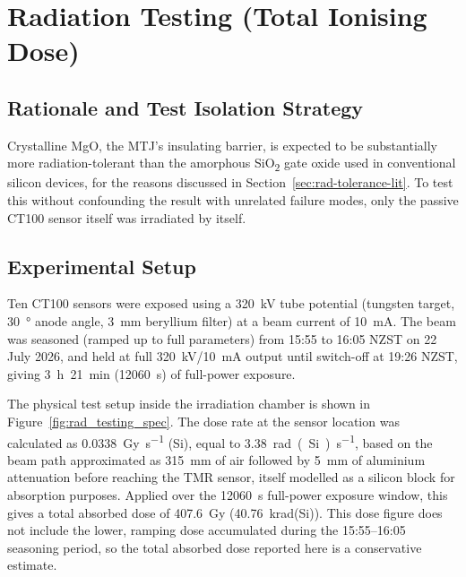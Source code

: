 \documentclass[12pt,a4paper]{article}
\begin{document}
\section{Radiation Testing (Total Ionising Dose)}
\label{sec:radiation-testing}

\subsection{Rationale and Test Isolation Strategy}
\label{sec:rad-rationale}

Crystalline MgO, the MTJ's insulating barrier, is expected to be substantially more radiation-tolerant than the amorphous SiO\textsubscript{2} gate oxide used in conventional silicon devices, for the reasons discussed in Section~\ref{sec:rad-tolerance-lit}. To test this without confounding the result with unrelated failure modes, only the passive CT100 sensor itself was irradiated by itself.


\subsection{Experimental Setup}
\label{sec:rad-setup}

Ten CT100 sensors were exposed using a \SI{320}{\kilo\volt} tube potential (tungsten target, \SI{30}{\degree} anode angle, \SI{3}{\milli\metre} beryllium filter) at a beam current of \SI{10}{\milli\ampere}. The beam was seasoned (ramped up to full parameters) from 15:55 to 16:05 NZST on 22 July 2026, and held at full \SI{320}{\kilo\volt}/\SI{10}{\milli\ampere} output until switch-off at 19:26 NZST, giving \SI{3}{\hour}~\SI{21}{\minute} (\SI{12060}{\second}) of full-power exposure.

The physical test setup inside the irradiation chamber is shown in Figure~\ref{fig:rad_testing_spec}. The dose rate at the sensor location was calculated as \SI{0.0338}{\gray\per\second} (Si), equal to \SI{3.38}{rad(Si)\per\second}, based on the beam path approximated as \SI{315}{\milli\metre} of air followed by \SI{5}{\milli\metre} of aluminium attenuation before reaching the TMR sensor, itself modelled as a silicon block for absorption purposes. Applied over the \SI{12060}{\second} full-power exposure window, this gives a total absorbed dose of \SI{407.6}{\gray} (\SI{40.76}{\kilo rad}(Si)). This dose figure does not include the lower, ramping dose accumulated during the 15:55--16:05 seasoning period, so the total absorbed dose reported here is a conservative estimate.
\end{document}
